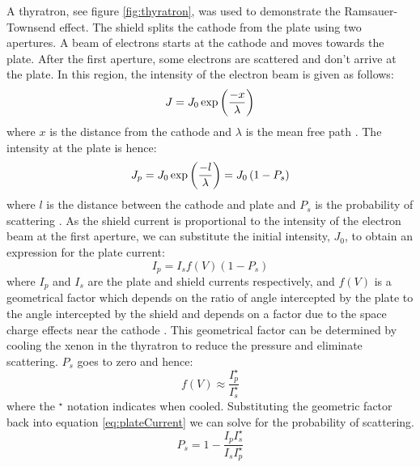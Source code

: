 \documentclass[%
reprint,
amsmath,amssymb,
aps,
floatfix
]{revtex4-2}
\begin{document}
	A thyratron, see figure \ref{fig:thyratron}, was used to demonstrate the Ramsauer-Townsend effect. The shield splits the cathode from the plate using two apertures. A beam of electrons starts at the cathode and moves towards the plate. After the first aperture, some electrons are scattered and don't arrive at the plate. In this region, the intensity of the electron beam is given as follows:
	\begin{equation}
		J = J_0 \exp{\left(-x \over \lambda \right)}
	\end{equation}where $x$ is the distance from the cathode and $\lambda$ is the mean free path \cite{kukolich}. The intensity at the plate is hence:
	\begin{equation}
		J_p = J_0 \exp{\left(-l \over \lambda \right)} = J_0 \left( 1 - P_s \right)
	\end{equation}where $l$ is the distance between the cathode and plate and $P_s$ is the probability of scattering \cite{kukolich}. As the shield current is proportional to the intensity of the electron beam at the first aperture, we can substitute the initial intensity, $J_0$, to obtain an expression for the plate current:
	\begin{equation}
		I_p = I_s f(V) (1-P_s)
		\label{eq:plateCurrent}
	\end{equation}where $I_p$ and $I_s$ are the plate and shield currents respectively, and $f(V)$ is a geometrical factor which depends on the ratio of angle intercepted by the plate to the angle intercepted by the shield and depends on a factor due to the space charge effects near the cathode \cite{kukolich}. This geometrical factor can be determined by cooling the xenon in the thyratron to reduce the pressure and eliminate scattering. $P_s$ goes to zero and hence:
	\begin{equation}
		f(V) \approx \frac{I_p^\star}{I_s^\star}
	\end{equation}where the $^\star$ notation indicates when cooled. Substituting the geometric factor back into equation \ref{eq:plateCurrent} we can solve for the probability of scattering.
	\begin{equation}
		P_s = 1 - \frac{I_p I_s^\star}{I_s I_p^\star}
		\label{eq:probability}
	\end{equation}\\
	
\end{document}
